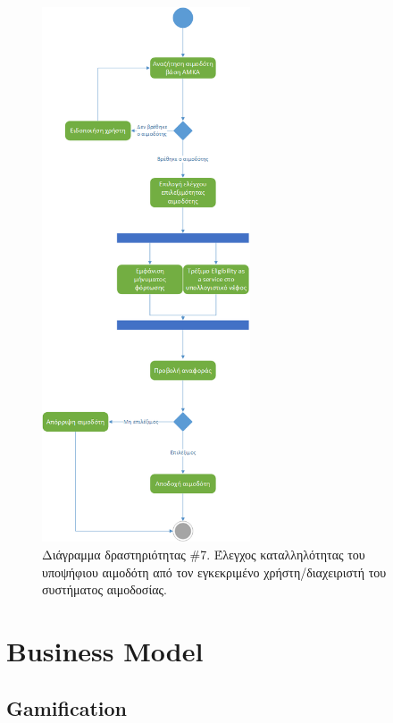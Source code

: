 	    \begin{figure}[H]
		    \centering
		    \includegraphics[width=0.55\textwidth]{EligibilityTest.png}
		    \caption{Διάγραμμα δραστηριότητας \#7. Έλεγχος καταλληλότητας του υποψήφιου αιμοδότη από τον  εγκεκριμένο χρήστη/διαχειριστή του συστήματος αιμοδοσίας.}
		    \label{fig:eligibiity}
		\end{figure}
		
\section{Business Model}
	\subsection{Gamification}
	
